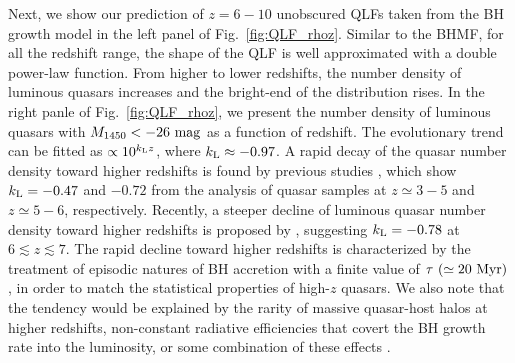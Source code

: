 \documentclass[twocolumn, twocolappendix]{aastex63}
\newcommand{\Muv}{M_{1450}}
\newcommand{\red}[1]{\textcolor{red}{ #1}}
\begin{document}
\begin{CJK*}{UTF8}{gbsn}
Next, we show our prediction of $z=6-10$ unobscured QLFs taken from the BH growth model in the left panel of Fig.~\ref{fig:QLF_rhoz}.
Similar to the BHMF, for all the redshift range, the shape of the QLF is well approximated with a double power-law function.
From higher to lower redshifts, the number density of luminous quasars increases and the bright-end of the distribution rises.
In the right panle of Fig.~\ref{fig:QLF_rhoz}, we present the number density of luminous quasars with $\Muv <-26~{\rm mag}$ as a function of redshift.
The evolutionary trend can be fitted as $\propto 10^{k_{\rm L}z}$, where $k_{\rm L}\approx -0.97$.
A rapid decay of the quasar number density toward higher redshifts is found by previous studies \citep[e.g.,][]{2001AJ....122.2833F,2016ApJ...833..222J},
which show $k_{\rm L}= -0.47$ and $-0.72$ from the analysis of quasar samples at $z\simeq 3-5$ and $z\simeq 5-6$, respectively.
Recently, a steeper decline of luminous quasar number density toward higher redshifts is proposed by \citet{2019ApJ...884...30W},
suggesting $k_{\rm L}=-0.78$ at $6\lesssim z \lesssim 7$.
The rapid decline toward higher redshifts is characterized by the treatment of episodic natures of BH accretion with a finite value of
$\tau ~(\simeq 20~{\rm Myr})$, in order to match the statistical properties of high-$z$ quasars.
We also note that the tendency would be explained by the rarity of massive quasar-host halos at higher redshifts,
non-constant radiative efficiencies that covert the BH growth rate into the luminosity, or some combination of these effects
\citep[e.g.,][]{2010ApJ...718..231S}.




\end{CJK*}
\end{document}
